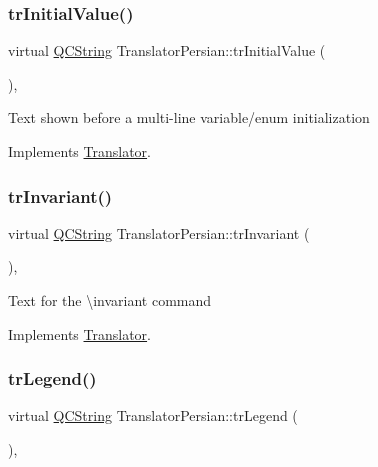 \subsubsection{\texorpdfstring{trInitialValue()}{trInitialValue()}}
{\footnotesize\ttfamily virtual \mbox{\hyperlink{class_q_c_string}{Q\+C\+String}} Translator\+Persian\+::tr\+Initial\+Value (\begin{DoxyParamCaption}{ }\end{DoxyParamCaption})\hspace{0.3cm}{\ttfamily [inline]}, {\ttfamily [virtual]}}

Text shown before a multi-\/line variable/enum initialization 

Implements \mbox{\hyperlink{class_translator}{Translator}}.

\mbox{\label{class_translator_persian_adcb0339741199a5b6c417bac790132c8}} 
\subsubsection{\texorpdfstring{trInvariant()}{trInvariant()}}
{\footnotesize\ttfamily virtual \mbox{\hyperlink{class_q_c_string}{Q\+C\+String}} Translator\+Persian\+::tr\+Invariant (\begin{DoxyParamCaption}{ }\end{DoxyParamCaption})\hspace{0.3cm}{\ttfamily [inline]}, {\ttfamily [virtual]}}

Text for the \textbackslash{}invariant command 

Implements \mbox{\hyperlink{class_translator}{Translator}}.

\mbox{\label{class_translator_persian_ac0e80c41bbe9381ae4dc8b1ae577dd5e}} 
\subsubsection{\texorpdfstring{trLegend()}{trLegend()}}
{\footnotesize\ttfamily virtual \mbox{\hyperlink{class_q_c_string}{Q\+C\+String}} Translator\+Persian\+::tr\+Legend (\begin{DoxyParamCaption}{ }\end{DoxyParamCaption})\hspace{0.3cm}{\ttfamily [inline]}, {\ttfamily [virtual]}}

